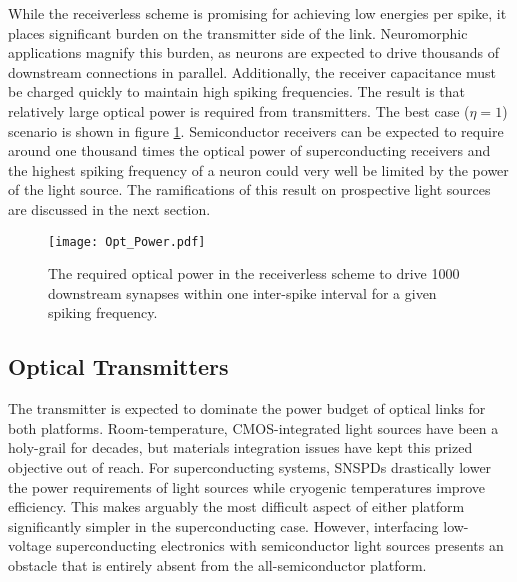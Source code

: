 \documentclass[twocolumn]{article}
\begin{document}
While the receiverless scheme is promising for achieving low energies per spike, it places significant burden on the transmitter side of the link. Neuromorphic applications magnify this burden, as neurons are expected to drive thousands of downstream connections in parallel. Additionally, the receiver capacitance must be charged quickly to maintain high spiking frequencies. The result is that relatively large optical power is required from transmitters. The best case ($\eta = 1$) scenario is shown in figure \ref{fig:communication}. Semiconductor receivers can be expected to require around one thousand times the optical power of superconducting receivers and the highest spiking frequency of a neuron could very well be limited by the power of the light source. The ramifications of this result on prospective light sources are discussed in the next section. 

\begin{figure}[h!]
    \centering
    \texttt{[image: Opt\_Power.pdf]}
    \caption{The required optical power in the receiverless scheme to drive 1000 downstream synapses within one inter-spike interval for a given spiking frequency.}
    \label{fig:communication}
\end{figure}

\subsection{Optical Transmitters}
The transmitter is expected to dominate the power budget of optical links for both platforms. Room-temperature, CMOS-integrated light sources have been a holy-grail for decades, but materials integration issues have kept this prized objective out of reach. For superconducting systems, SNSPDs drastically lower the power requirements of light sources while cryogenic temperatures improve efficiency. This makes arguably the most difficult aspect of either platform significantly simpler in the superconducting case. However, interfacing low-voltage superconducting electronics with semiconductor light sources presents an obstacle that is entirely absent from the all-semiconductor platform.
\end{document}
